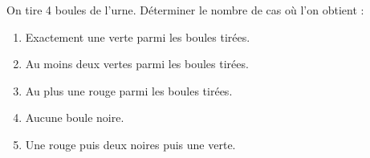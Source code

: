 \documentclass[12pt,a4paper]{article}
\begin{document}
On tire 4 boules de l'urne. Déterminer le nombre de cas où l'on obtient :

\begin{enumerate}
    \item Exactement une verte parmi les boules tirées.
    \item Au moins deux vertes parmi les boules tirées.
    \item Au plus une rouge parmi les boules tirées.
    \item Aucune boule noire.
    \item Une rouge puis deux noires puis une verte.
\end{enumerate}

\subsubsection*{\underline{\color{red}{Solution}}}

\renewcommand{\arraystretch}{2} %
\end{document}
